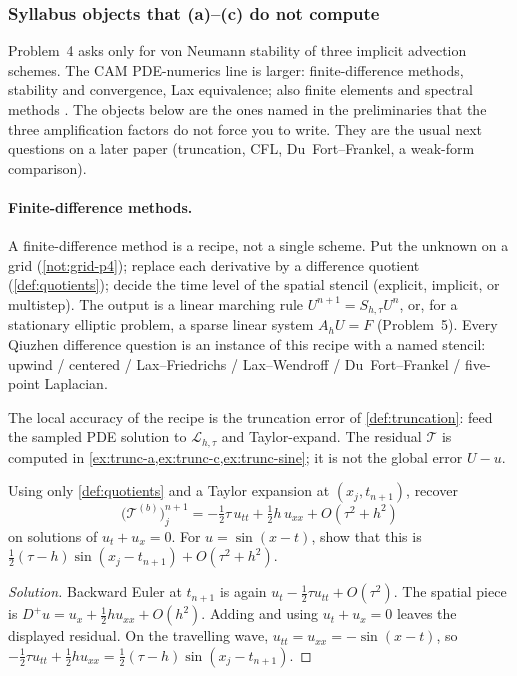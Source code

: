 \documentclass[11pt,a4paper]{article}
\begin{document}
\subsubsection{Syllabus objects that (a)--(c) do not compute}

Problem~4 asks only for von Neumann stability of three implicit advection schemes. The CAM PDE-numerics line is larger: finite-difference methods, stability and convergence, Lax equivalence; also finite elements and spectral methods \cite{gko95,leveque07,strikwerda04,brennerscott10,trefethen00}. The objects below are the ones named in the preliminaries that the three amplification factors do not force you to write. They are the usual next questions on a later paper (truncation, CFL, Du~Fort--Frankel, a weak-form comparison).

\paragraph{Finite-difference methods.}

A finite-difference method is a recipe, not a single scheme. Put the unknown on a grid (\cref{not:grid-p4}); replace each derivative by a difference quotient (\cref{def:quotients}); decide the time level of the spatial stencil (explicit, implicit, or multistep). The output is a linear marching rule \(U^{n+1}=S_{h,\tau}U^n\), or, for a stationary elliptic problem, a sparse linear system \(A_h U=F\) (Problem~5). Every Qiuzhen difference question is an instance of this recipe with a named stencil: upwind / centered / Lax--Friedrichs / Lax--Wendroff / Du~Fort--Frankel / five-point Laplacian.

The local accuracy of the recipe is the truncation error of \cref{def:truncation}: feed the sampled PDE solution to \(\mathcal L_{h,\tau}\) and Taylor-expand. The residual \(\mathcal T\) is computed in \cref{ex:trunc-a,ex:trunc-c,ex:trunc-sine}; it is not the global error \(U-u\).

\begin{exercise}
\label{exer:trunc-a}
Using only \cref{def:quotients} and a Taylor expansion at \((x_j,t_{n+1})\), recover
\[
\bigl(\mathcal T^{(b)}\bigr)_j^{n+1}
=
-\tfrac12\tau\,u_{tt}
+
\tfrac12 h\,u_{xx}
+
O(\tau^2+h^2)
\]
on solutions of \(u_t+u_x=0\). For \(u=\sin(x-t)\), show that this is \(\tfrac12(\tau-h)\sin(x_j-t_{n+1})+O(\tau^2+h^2)\).
\end{exercise}

\begin{proof}[Solution]
Backward Euler at \(t_{n+1}\) is again \(u_t-\tfrac12\tau u_{tt}+O(\tau^2)\). The spatial piece is \(D^+u=u_x+\tfrac12 h u_{xx}+O(h^2)\). Adding and using \(u_t+u_x=0\) leaves the displayed residual. On the travelling wave, \(u_{tt}=u_{xx}=-\sin(x-t)\), so \(-\tfrac12\tau u_{tt}+\tfrac12 h u_{xx}=\tfrac12(\tau-h)\sin(x_j-t_{n+1})\).
\end{proof}
\end{document}

